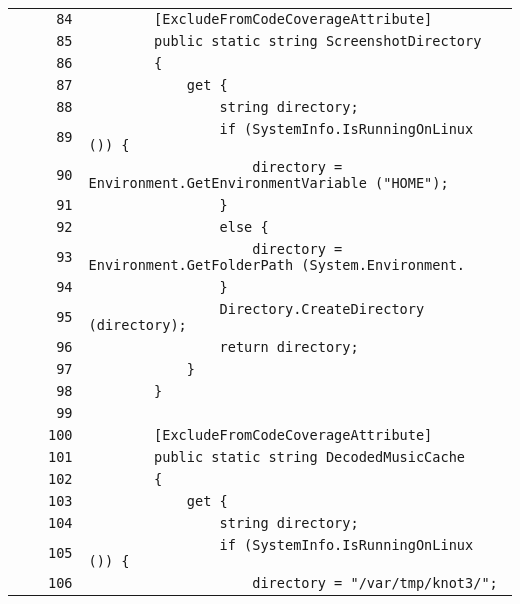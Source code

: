 \documentclass[a4paper,10pt]{article}
\begin{document}
\begin{longtable}[l]{lrrl}
\cellcolor{gray} &  & \verb~84~ & \verb~        [ExcludeFromCodeCoverageAttribute]~\\
\cellcolor{gray} &  & \verb~85~ & \verb~        public static string ScreenshotDirectory~\\
\cellcolor{gray} &  & \verb~86~ & \verb~        {~\\
\cellcolor{gray} &  & \verb~87~ & \verb~            get {~\\
\cellcolor{gray} &  & \verb~88~ & \verb~                string directory;~\\
\cellcolor{gray} &  & \verb~89~ & \verb~                if (SystemInfo.IsRunningOnLinux ()) {~\\
\cellcolor{gray} &  & \verb~90~ & \verb~                    directory = Environment.GetEnvironmentVariable ("HOME");~\\
\cellcolor{gray} &  & \verb~91~ & \verb~                }~\\
\cellcolor{gray} &  & \verb~92~ & \verb~                else {~\\
\cellcolor{gray} &  & \verb~93~ & \verb~                    directory = Environment.GetFolderPath (System.Environment.~\\
\cellcolor{gray} &  & \verb~94~ & \verb~                }~\\
\cellcolor{gray} &  & \verb~95~ & \verb~                Directory.CreateDirectory (directory);~\\
\cellcolor{gray} &  & \verb~96~ & \verb~                return directory;~\\
\cellcolor{gray} &  & \verb~97~ & \verb~            }~\\
\cellcolor{gray} &  & \verb~98~ & \verb~        }~\\
\cellcolor{gray} &  & \verb~99~ & \verb~~\\
\cellcolor{gray} &  & \verb~100~ & \verb~        [ExcludeFromCodeCoverageAttribute]~\\
\cellcolor{gray} &  & \verb~101~ & \verb~        public static string DecodedMusicCache~\\
\cellcolor{gray} &  & \verb~102~ & \verb~        {~\\
\cellcolor{gray} &  & \verb~103~ & \verb~            get {~\\
\cellcolor{gray} &  & \verb~104~ & \verb~                string directory;~\\
\cellcolor{gray} &  & \verb~105~ & \verb~                if (SystemInfo.IsRunningOnLinux ()) {~\\
\cellcolor{gray} &  & \verb~106~ & \verb~                    directory = "/var/tmp/knot3/";~\\

\end{longtable}
\end{document}
